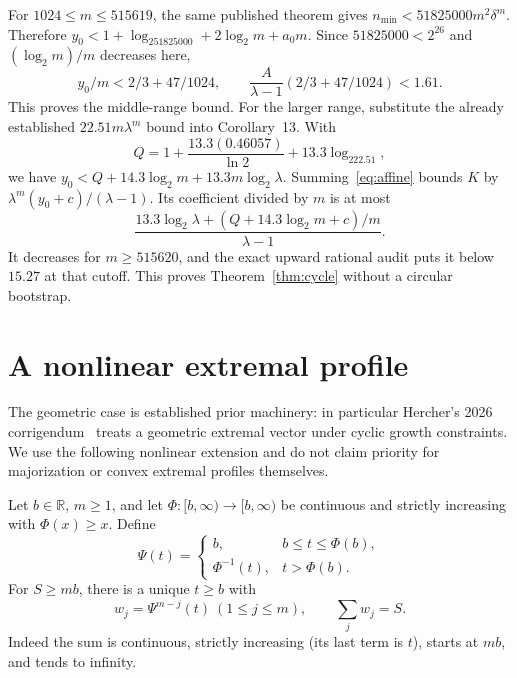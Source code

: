 \documentclass[11pt]{article}
\theoremstyle{definition}\newtheorem{definition}[theorem]{Definition}
\newcommand{\lb}{\log_2}
\newcommand{\RR}{\mathbb R}
\begin{document}
For $1024\le m\le515619$, the same published theorem gives $n_{\min}<51825000m^2\delta^m$. Therefore
$y_0<1+\lb51825000+2\lb m+a_0m$. Since $51825000<2^{26}$ and $(\lb m)/m$ decreases here,
\[
 y_0/m<2/3+47/1024,\qquad
 \frac{A}{\lambda-1}(2/3+47/1024)<1.61.
\]
This proves the middle-range bound. For the larger range, substitute the already established $22.51m\lambda^m$ bound into Corollary~13. With
\[
 Q=1+\frac{13.3(0.46057)}{\ln2}+13.3\lb22.51,
\]
we have $y_0<Q+14.3\lb m+13.3m\lb\lambda$. Summing~\eqref{eq:affine} bounds $K$ by $\lambda^m(y_0+c)/(\lambda-1)$. Its coefficient divided by $m$ is at most
\[
 \frac{13.3\lb\lambda+(Q+14.3\lb m+c)/m}{\lambda-1}.
\]
It decreases for $m\ge515620$, and the exact upward rational audit puts it below $15.27$ at that cutoff. This proves Theorem~\ref{thm:cycle} without a circular bootstrap.

\section{A nonlinear extremal profile}\label{sec:majorization}
The geometric case is established prior machinery: in particular Hercher's 2026 corrigendum~\cite{hercher} treats a geometric extremal vector under cyclic growth constraints. We use the following nonlinear extension and do not claim priority for majorization or convex extremal profiles themselves.

Let $b\in\RR$, $m\ge1$, and let $\Phi:[b,\infty)\to[b,\infty)$ be continuous and strictly increasing with $\Phi(x)\ge x$. Define
\[
 \Psi(t)=\begin{cases}b,&b\le t\le\Phi(b),\\
 \Phi^{-1}(t),&t>\Phi(b).
 \end{cases}
\]
For $S\ge mb$, there is a unique $t\ge b$ with
\[
 w_j=\Psi^{m-j}(t)\ (1\le j\le m),\qquad \sum_jw_j=S.
\]
Indeed the sum is continuous, strictly increasing (its last term is $t$), starts at $mb$, and tends to infinity.
\end{document}
